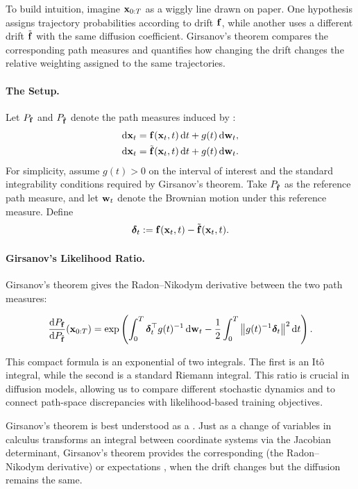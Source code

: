 To build intuition, imagine ${\mathbf{x}}_{0:T}$ as a wiggly line drawn on paper.
One hypothesis assigns trajectory probabilities according to drift ${\mathbf{f}}$,
while another uses a different drift $\tilde{{\mathbf{f}}}$ with the same diffusion
coefficient. Girsanov's theorem compares the corresponding path measures and
quantifies how changing the drift changes the relative weighting assigned to
the same trajectories.

\paragraph{The Setup.}
Let $P_{{\mathbf{f}}}$ and $P_{\tilde{{\mathbf{f}}}}$ denote the path measures induced by
:
\begin{align*}
    \mathop{}\!\mathrm{d}{\mathbf{x}}_t
    &= {\mathbf{f}}({\mathbf{x}}_t,t)\mathop{}\!\mathrm{d} t + g(t)\mathop{}\!\mathrm{d}{\mathbf{w}}_t,
    \\
    \mathop{}\!\mathrm{d}{\mathbf{x}}_t
    &= \tilde{{\mathbf{f}}}({\mathbf{x}}_t,t)\mathop{}\!\mathrm{d} t + g(t)\mathop{}\!\mathrm{d}{\mathbf{w}}_t.
\end{align*}
For simplicity, assume $g(t)>0$ on the interval of interest and the
standard integrability conditions required by Girsanov's theorem. Take
$P_{\tilde{{\mathbf{f}}}}$ as the reference path measure, and let ${\mathbf{w}}_t$ denote
the Brownian motion under this reference measure. Define
\[
\bm{\delta}_t
:=
{\mathbf{f}}({\mathbf{x}}_t,t)-\tilde{{\mathbf{f}}}({\mathbf{x}}_t,t).
\]

\paragraph{Girsanov's Likelihood Ratio.}
Girsanov's theorem gives the Radon--Nikodym derivative between the two path
measures:
\begin{mdframed}
\[
\frac{\mathop{}\!\mathrm{d} P_{{\mathbf{f}}}}{\mathop{}\!\mathrm{d} P_{\tilde{{\mathbf{f}}}}}({\mathbf{x}}_{0:T})
=
\exp\left(
\int_0^T
\bm{\delta}_t^\top g(t)^{-1}\mathop{}\!\mathrm{d}{\mathbf{w}}_t
-
\frac{1}{2}
\int_0^T
\big\|g(t)^{-1}\bm{\delta}_t\big\|^2
\mathop{}\!\mathrm{d} t
\right).
\]
\end{mdframed}
This compact formula is an exponential of two integrals. The first is an It\^o integral, while the second is a standard Riemann integral. This ratio is crucial in diffusion models, allowing us to compare
different stochastic dynamics and to connect path-space discrepancies
with likelihood-based training objectives.

Girsanov's theorem is best understood as a . Just as a change of variables in calculus transforms an integral between coordinate systems via the Jacobian determinant, Girsanov's theorem provides the corresponding  (the Radon–Nikodym derivative)  or expectations , when the drift changes but the diffusion remains the same.




